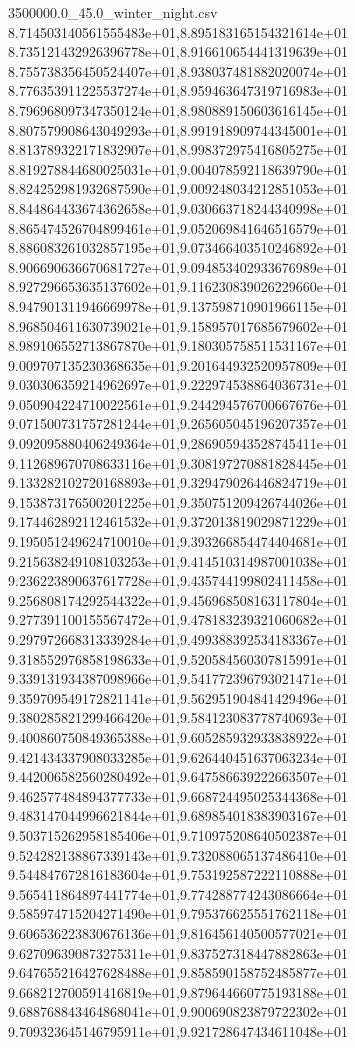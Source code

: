 \begin{filecontents*}{3500000.0_45.0_winter_night.csv}
8.714503140561555483e+01,8.895183165154321614e+01
8.735121432926396778e+01,8.916610654441319639e+01
8.755738356450524407e+01,8.938037481882020074e+01
8.776353911225537274e+01,8.959463647319716983e+01
8.796968097347350124e+01,8.980889150603616145e+01
8.807579908643049293e+01,8.991918909744345001e+01
8.813789322171832907e+01,8.998372975416805275e+01
8.819278844680025031e+01,9.004078592118639790e+01
8.824252981932687590e+01,9.009248034212851053e+01
8.844864433674362658e+01,9.030663718244340998e+01
8.865474526704899461e+01,9.052069841646516579e+01
8.886083261032857195e+01,9.073466403510246892e+01
8.906690636670681727e+01,9.094853402933676989e+01
8.927296653635137602e+01,9.116230839026229660e+01
8.947901311946669978e+01,9.137598710901966115e+01
8.968504611630739021e+01,9.158957017685679602e+01
8.989106552713867870e+01,9.180305758511531167e+01
9.009707135230368635e+01,9.201644932520957809e+01
9.030306359214962697e+01,9.222974538864036731e+01
9.050904224710022561e+01,9.244294576700667676e+01
9.071500731757281244e+01,9.265605045196207357e+01
9.092095880406249364e+01,9.286905943528745411e+01
9.112689670708633116e+01,9.308197270881828445e+01
9.133282102720168893e+01,9.329479026446824719e+01
9.153873176500201225e+01,9.350751209426744026e+01
9.174462892112461532e+01,9.372013819029871229e+01
9.195051249624710010e+01,9.393266854474404681e+01
9.215638249108103253e+01,9.414510314987001038e+01
9.236223890637617728e+01,9.435744199802411458e+01
9.256808174292544322e+01,9.456968508163117804e+01
9.277391100155567472e+01,9.478183239321060682e+01
9.297972668313339284e+01,9.499388392534183367e+01
9.318552976858198633e+01,9.520584560307815991e+01
9.339131934387098966e+01,9.541772396793021471e+01
9.359709549172821141e+01,9.562951904841429496e+01
9.380285821299466420e+01,9.584123083778740693e+01
9.400860750849365388e+01,9.605285932933838922e+01
9.421434337908033285e+01,9.626440451637063234e+01
9.442006582560280492e+01,9.647586639222663507e+01
9.462577484894377733e+01,9.668724495025344368e+01
9.483147044996621844e+01,9.689854018383903167e+01
9.503715262958185406e+01,9.710975208640502387e+01
9.524282138867339143e+01,9.732088065137486410e+01
9.544847672816183604e+01,9.753192587222110888e+01
9.565411864897441774e+01,9.774288774243086664e+01
9.585974715204271490e+01,9.795376625551762118e+01
9.606536223830676136e+01,9.816456140500577021e+01
9.627096390873275311e+01,9.837527318447882863e+01
9.647655216427628488e+01,9.858590158752485877e+01
9.668212700591416819e+01,9.879644660775193188e+01
9.688768843464868041e+01,9.900690823879722302e+01
9.709323645146795911e+01,9.921728647434611048e+01

\end{filecontents*}
